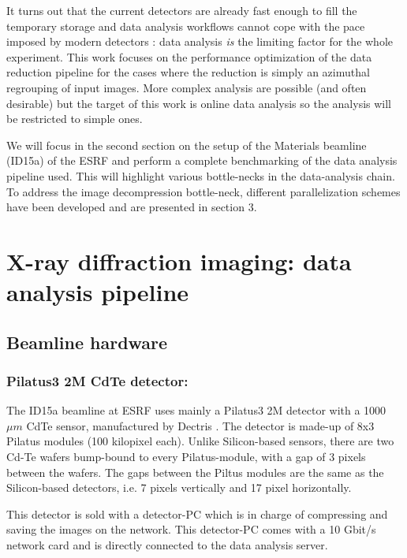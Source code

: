 \documentclass[preprint]{iucr}              %
\begin{document}
 
It turns out that the current detectors are already fast enough to fill the temporary
storage and data analysis workflows cannot cope with the pace imposed by
modern detectors \cite{GigaFRoST}: data analysis \emph{is} the limiting factor
for the whole experiment.
This work focuses on the performance optimization of the data reduction
pipeline for the cases where the reduction is simply an azimuthal
regrouping of input images.
More complex analysis are possible (and often desirable) but the target of this
work is online data analysis so the analysis will be restricted to simple ones.

We will focus in the second section on the setup of the Materials beamline
(ID15a) of the ESRF  \cite{id15a} and perform a complete benchmarking of the
data analysis pipeline used. 
This will highlight various bottle-necks in the data-analysis chain.
To address the image decompression bottle-neck, different parallelization
schemes have been developed and are presented in section 3. 

\section{X-ray diffraction imaging: data analysis pipeline}

\subsection{Beamline hardware}

\subsubsection{Pilatus3 2M CdTe detector:}

The ID15a beamline at ESRF uses mainly a Pilatus3 2M detector with a 1000 $\mu
m$ CdTe sensor, manufactured by Dectris \cite{pilatus}. 
The detector is made-up of 8x3 Pilatus modules (100 kilopixel each).
Unlike Silicon-based sensors, there are two Cd-Te wafers bump-bound to every
Pilatus-module, with a gap of 3 pixels between the wafers.
The gaps between the Piltus modules are the same as the Silicon-based
detectors, i.e. 7 pixels vertically and 17 pixel horizontally.

This detector is sold with a detector-PC which is in charge of compressing and
saving the images on the network. 
This detector-PC comes with a 10 Gbit/s network card and is directly connected
to the data analysis server.
\end{document}
